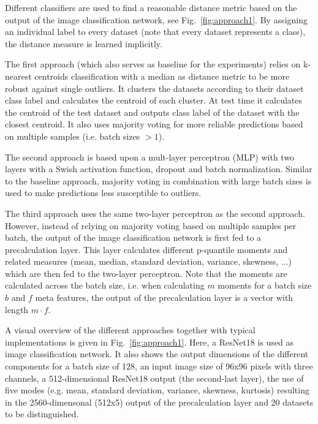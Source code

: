 \documentclass{article}
\begin{document}
Different classifiers are used to find a reasonable distance metric based on the output of the image classification network, see Fig.~\ref{fig:approach1}. By assigning an individual label to every dataset (note that every dataset represents a class), the distance measure is learned implicitly.

The first approach (which also serves as baseline for the experiments) relies on k-nearest centroids classification with a median as distance metric to be more robust against single outliers. It clusters the datasets according to their dataset class label and calculates the centroid of each cluster.
At test time it calculates the centroid of the test dataset and outputs class label of the dataset with the closest centroid. It also uses majority voting for more reliable predictions based on multiple samples (i.e. batch sizes $>1$).

The second approach is based upon a mult-layer perceptron (MLP) with two layers with a Swish activation function, dropout and batch normalization. Similar to the baseline approach, majority voting in combination with large batch sizes is used to make predictions less susceptible to outliers.

The third approach uses the same two-layer perceptron as the second approach. However, instead of relying on majority voting based on multiple samples per batch, the output of the image classification network is first fed to a precalculation layer. This layer calculates different p-quantile moments and related measures (mean, median, standard deviation, variance, skewness, ...) which are then fed to the two-layer perceptron. Note that the moments are calculated across the batch size, i.e. when calculating $m$ moments for a batch size $b$ and $f$ meta features, the output of the precalculation layer is a vector with length $m \cdot f$. 

A visual overview of the different approaches together with typical implementations is given in Fig.~\ref{fig:approach1}. Here, a ResNet18 is used as image classification network. It also shows the output dimensions of the different components for a batch size of 128, an input image size of 96x96 pixels with three channels, a 512-dimensional ResNet18 output (the second-last layer), the use of five modes (e.g. mean, standard deviation, variance, skewness, kurtosis) resulting in the 2560-dimensonal (512x5) output of the precalculation layer and 20 datasets to be distinguished.
\end{document}
